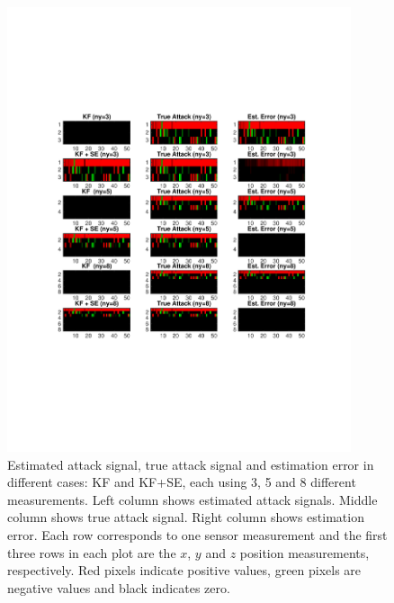 \documentclass[../../thesis.tex]{subfiles}
\begin{document}
\begin{figure}
\center
\includegraphics[width=0.9\textwidth]{chapters/se_linear/figures/qh/uav_lqg_error}
\caption{Estimated attack signal, true attack signal and estimation error in different cases: KF and KF+SE, each using 3, 5 and 8 different measurements. Left column shows estimated attack signals. Middle column shows true attack signal. Right column shows estimation error. Each row corresponds to one sensor measurement and the first three rows in each plot are the $x$, $y$ and $z$ position measurements, respectively. Red pixels indicate positive values, green pixels are negative values and black indicates zero.}
\label{fig:ex_uav_error}
\end{figure}
\end{document}
